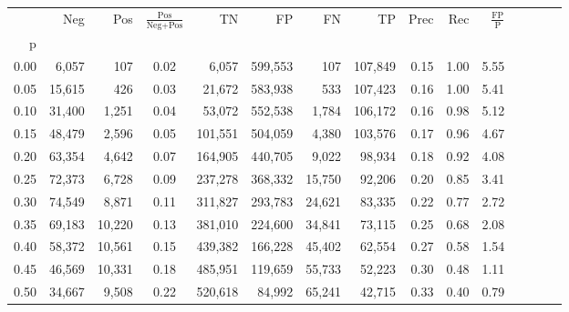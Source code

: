 \begin{tabular}{rrrcrrrrrrrrrrr}
\toprule
{} &     Neg &     Pos & $\frac{\text{Pos}}{\text{Neg}+\text{Pos}}$ &       TN &       FP &       FN &       TP &  Prec &   Rec & $\frac{\text{FP}}{\text{P}}$ \\
p    &         &         &                                            &          &          &          &          &       &       &                              \\
\midrule
0.00 &   6,057 &     107 &                                       0.02 &    6,057 &  599,553 &      107 &  107,849 &  0.15 &  1.00 &                         5.55 \\
0.05 &  15,615 &     426 &                                       0.03 &   21,672 &  583,938 &      533 &  107,423 &  0.16 &  1.00 &                         5.41 \\
0.10 &  31,400 &   1,251 &                                       0.04 &   53,072 &  552,538 &    1,784 &  106,172 &  0.16 &  0.98 &                         5.12 \\
0.15 &  48,479 &   2,596 &                                       0.05 &  101,551 &  504,059 &    4,380 &  103,576 &  0.17 &  0.96 &                         4.67 \\
0.20 &  63,354 &   4,642 &                                       0.07 &  164,905 &  440,705 &    9,022 &   98,934 &  0.18 &  0.92 &                         4.08 \\
0.25 &  72,373 &   6,728 &                                       0.09 &  237,278 &  368,332 &   15,750 &   92,206 &  0.20 &  0.85 &                         3.41 \\
0.30 &  74,549 &   8,871 &                                       0.11 &  311,827 &  293,783 &   24,621 &   83,335 &  0.22 &  0.77 &                         2.72 \\
0.35 &  69,183 &  10,220 &                                       0.13 &  381,010 &  224,600 &   34,841 &   73,115 &  0.25 &  0.68 &                         2.08 \\
0.40 &  58,372 &  10,561 &                                       0.15 &  439,382 &  166,228 &   45,402 &   62,554 &  0.27 &  0.58 &                         1.54 \\
0.45 &  46,569 &  10,331 &                                       0.18 &  485,951 &  119,659 &   55,733 &   52,223 &  0.30 &  0.48 &                         1.11 \\
0.50 &  34,667 &   9,508 &                                       0.22 &  520,618 &   84,992 &   65,241 &   42,715 &  0.33 &  0.40 &                         0.79 \\

\end{tabular}
